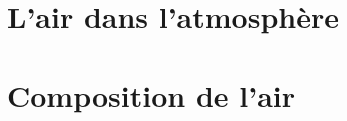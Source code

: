 \documentclass[xcolor={dvipsnames}]{beamer}
\title{}
\author{O. FINOT}\institute{Collège S$^t$ Bernard}
\begin{document}
\begin{frame}
  \titlepage 
\end{frame}

\section{L'air dans l'atmosphère}



\begin{frame}
	
\end{frame}


\begin{frame}
	
\end{frame}



\section{Composition de l'air}

\begin{frame}
	
\end{frame}


\begin{frame}
	
\end{frame}
%
%
%	
%
%
%	
%
%
%	
%
%
%	
\end{document}
